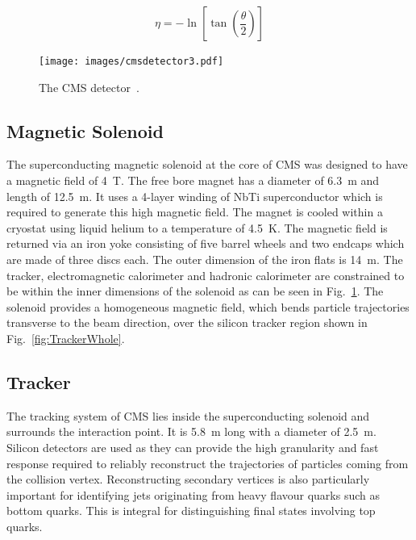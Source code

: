 \begin{equation}
    \eta = - \ln \left[ \tan \left(\frac{\theta}{2} \right) \right]
    \label{eqn:eta}
\end{equation}

\begin{figure}[ht!]
\centering
    \texttt{[image: images/cmsdetector3.pdf]}
    \caption{The CMS detector~\cite{1742-6596-513-2-022032}.}
    \label{fig:CMSdetector}
\end{figure}


\subsection{Magnetic Solenoid}

The superconducting magnetic solenoid at the core of CMS was designed to have a magnetic field of 4~T. The free bore magnet has a diameter of 6.3~m and length of 12.5~m. It uses a 4-layer winding of NbTi superconductor which is required to generate this high magnetic field. The magnet is cooled within a cryostat using liquid helium to a temperature of 4.5~K. The magnetic field is returned via an iron yoke consisting of five barrel wheels and two endcaps which are made of three discs each. The outer dimension of the iron flats is 14~m. The tracker, electromagnetic calorimeter and hadronic calorimeter are constrained to be within the inner dimensions of the solenoid as can be seen in Fig.~\ref{fig:CMSdetector}. The solenoid provides a homogeneous magnetic field, which bends particle trajectories transverse to the beam direction, over the silicon tracker region shown in Fig.~\ref{fig:TrackerWhole}.

\subsection{Tracker \label{sec:tracker}}

The tracking system of CMS lies inside the superconducting solenoid and surrounds the interaction point. It is 5.8~m long with a diameter of 2.5~m.
Silicon detectors are used as they can provide the high granularity and fast response required to reliably reconstruct the trajectories of particles coming from the collision vertex.
Reconstructing secondary vertices is also particularly important for identifying jets originating from heavy flavour quarks such as bottom quarks. This is integral for distinguishing final states involving top quarks.

